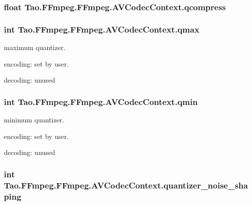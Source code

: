 \label{struct_tao_1_1_f_fmpeg_1_1_f_fmpeg_1_1_a_v_codec_context_a719cc58978dc1aaa2e9790ca7b32af77}
\hypertarget{struct_tao_1_1_f_fmpeg_1_1_f_fmpeg_1_1_a_v_codec_context_a920ddaa1bcf9914451d377dacf22c04b}{
\subsubsection[{qcompress}]{\setlength{\rightskip}{0pt plus 5cm}float {\bf Tao.FFmpeg.FFmpeg.AVCodecContext.qcompress}}}
\label{struct_tao_1_1_f_fmpeg_1_1_f_fmpeg_1_1_a_v_codec_context_a920ddaa1bcf9914451d377dacf22c04b}
\hypertarget{struct_tao_1_1_f_fmpeg_1_1_f_fmpeg_1_1_a_v_codec_context_a6bcfa22032b804e464da90582c67d702}{
\subsubsection[{qmax}]{\setlength{\rightskip}{0pt plus 5cm}int {\bf Tao.FFmpeg.FFmpeg.AVCodecContext.qmax}}}
\label{struct_tao_1_1_f_fmpeg_1_1_f_fmpeg_1_1_a_v_codec_context_a6bcfa22032b804e464da90582c67d702}
maximum quantizer.
\begin{DoxyItemize}
\item encoding: set by user.
\item decoding: unused 
\end{DoxyItemize}\hypertarget{struct_tao_1_1_f_fmpeg_1_1_f_fmpeg_1_1_a_v_codec_context_a184f337bac7a5434eb61f681ed680885}{
\subsubsection[{qmin}]{\setlength{\rightskip}{0pt plus 5cm}int {\bf Tao.FFmpeg.FFmpeg.AVCodecContext.qmin}}}
\label{struct_tao_1_1_f_fmpeg_1_1_f_fmpeg_1_1_a_v_codec_context_a184f337bac7a5434eb61f681ed680885}
minimum quantizer.
\begin{DoxyItemize}
\item encoding: set by user.
\item decoding: unused 
\end{DoxyItemize}\hypertarget{struct_tao_1_1_f_fmpeg_1_1_f_fmpeg_1_1_a_v_codec_context_a2b551fbb06e37e03790f4be0f0a1bb8d}{
\subsubsection[{quantizer\_\-noise\_\-shaping}]{\setlength{\rightskip}{0pt plus 5cm}int {\bf Tao.FFmpeg.FFmpeg.AVCodecContext.quantizer\_\-noise\_\-shaping}}}
